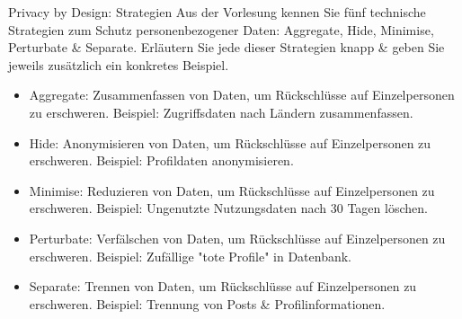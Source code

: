 \documentclass{article}
\begin{document}
\begin{exercise}{Privacy by Design: Strategien}
  Aus der Vorlesung kennen Sie fünf technische Strategien zum Schutz personenbezogener Daten: Aggregate, Hide, Minimise, Perturbate \& Separate.
  Erläutern Sie jede dieser Strategien knapp \& geben Sie jeweils zusätzlich ein konkretes Beispiel.

  \begin{solution}
    \begin{itemize}
      \item Aggregate: Zusammenfassen von Daten, um Rückschlüsse auf Einzelpersonen zu erschweren. Beispiel: Zugriffsdaten nach Ländern zusammenfassen.
      \item Hide: Anonymisieren von Daten, um Rückschlüsse auf Einzelpersonen zu erschweren. Beispiel: Profildaten anonymisieren.
      \item Minimise: Reduzieren von Daten, um Rückschlüsse auf Einzelpersonen zu erschweren. Beispiel: Ungenutzte Nutzungsdaten nach 30 Tagen löschen.
      \item Perturbate: Verfälschen von Daten, um Rückschlüsse auf Einzelpersonen zu erschweren. Beispiel: Zufällige "tote Profile" in Datenbank.
      \item Separate: Trennen von Daten, um Rückschlüsse auf Einzelpersonen zu erschweren. Beispiel: Trennung von Posts \& Profilinformationen.
    \end{itemize}
  \end{solution}
\end{exercise}
\end{document}

